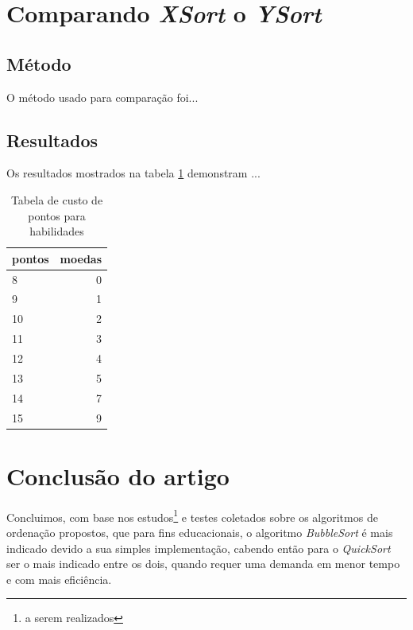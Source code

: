 \documentclass[a4paper,10pt]{article} %
\begin{document}
\section{Comparando \textit{XSort} o \textit{YSort}}

\subsection{Método}

O método usado para comparação foi...

\subsection{Resultados}

Os resultados mostrados na tabela \ref{tab:resultados} demonstram ...

\begin{table}
\begin{center}
 \caption{Tabela de custo de pontos para habilidades}
\begin{tabular}{|l|r|}
  \hline \hline
  pontos & moedas \\ \hline \hline
   8 & 0 \\ \hline
   9 & 1 \\ \hline
  10 & 2 \\ \hline
  11 & 3 \\ \hline
  12 & 4 \\ \hline
  13 & 5 \\ \hline
  14 & 7 \\ \hline
  15 & 9 \\ \hline \hline
\end{tabular} 
\label{tab:resultados}
\end{center}
\end{table}


\section{Conclusão do artigo}

    Concluimos, com base nos estudos\footnote{a serem realizados}  e testes coletados sobre os algoritmos de ordenação propostos, que para fins educacionais, o algoritmo \textit{BubbleSort} é mais indicado devido a sua simples implementação, cabendo então para o \textit{QuickSort} ser o mais indicado entre os dois, quando requer uma demanda em menor tempo e com mais eficiência.
\end{document}

